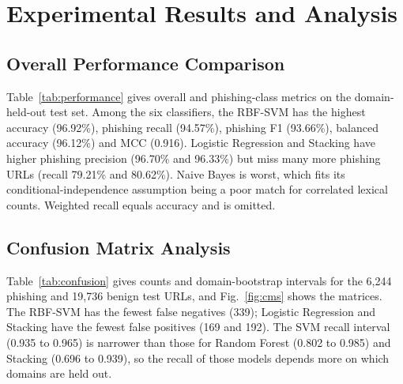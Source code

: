 \documentclass[conference]{IEEEtran}
\begin{document}
\section{Experimental Results and Analysis}
\label{sec:results}

\subsection{Overall Performance Comparison}
Table~\ref{tab:performance} gives overall and phishing-class metrics on the domain-held-out test set. Among the six classifiers, the RBF-SVM has the highest accuracy (96.92\%), phishing recall (94.57\%), phishing F1 (93.66\%), balanced accuracy (96.12\%) and MCC (0.916). Logistic Regression and Stacking have higher phishing precision (96.70\% and 96.33\%) but miss many more phishing URLs (recall 79.21\% and 80.62\%). Naive Bayes is worst, which fits its conditional-independence assumption being a poor match for correlated lexical counts. Weighted recall equals accuracy and is omitted.

\begin{table}[htbp]
\centering
\caption{Overall and Phishing-Class Metrics on the Domain-Held-Out Test Set (\%; Test Set 76\% Benign)}
\label{tab:performance}
\small
{}
\end{table}

\subsection{Confusion Matrix Analysis}
Table~\ref{tab:confusion} gives counts and domain-bootstrap intervals for the 6{,}244 phishing and 19{,}736 benign test URLs, and Fig.~\ref{fig:cms} shows the matrices. The RBF-SVM has the fewest false negatives (339); Logistic Regression and Stacking have the fewest false positives (169 and 192). The SVM recall interval (0.935 to 0.965) is narrower than those for Random Forest (0.802 to 0.985) and Stacking (0.696 to 0.939), so the recall of those models depends more on which domains are held out.
\end{document}
